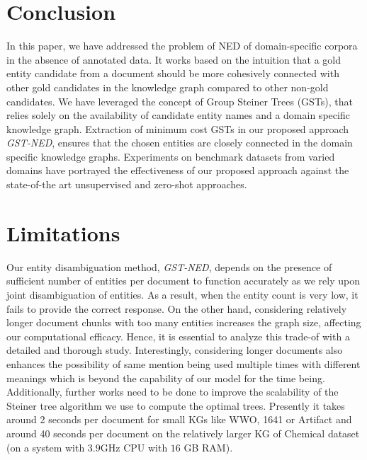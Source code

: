 \documentclass[11pt]{article}
\newcommand{\ts}[1]{\textcolor{blue}{[{DD: #1}]}}
\begin{document}


\section{Conclusion}
In this paper, we have addressed the problem of NED of domain-specific corpora in the absence of annotated data. It works based on the intuition that a gold
entity candidate from a document should be more cohesively connected with other gold candidates in the
knowledge graph compared to other non-gold candidates. We have leveraged the concept of Group Steiner Trees (GSTs), that relies solely on the availability of candidate entity names and a domain specific knowledge graph. Extraction of minimum cost GSTs in our proposed approach \emph{GST-NED}, ensures that the chosen entities are closely connected in the domain specific knowledge graphs.
Experiments on benchmark datasets from varied domains have portrayed the effectiveness of our proposed approach against the state-of-the art unsupervised and zero-shot approaches.

\section*{Limitations}
Our entity disambiguation method, \emph{GST-NED}, depends on the presence of sufficient number of entities per document to function accurately as we rely upon joint disambiguation of entities. As a result, when the entity count is very low, it fails to provide the correct response.
On the other hand, considering relatively longer document chunks with too many entities increases the graph size, affecting our computational efficacy. Hence, it is essential to analyze this trade-of with a detailed and thorough study. Interestingly, considering longer documents also enhances the possibility of same mention being used multiple times with different meanings which is beyond the capability of our model for the time being. 
Additionally, further works need to be done to improve the scalability of the Steiner tree algorithm we use to compute the optimal trees. Presently it takes around 2 seconds per document for small KGs like WWO, 1641 or Artifact and around 40 seconds per document on the relatively larger KG of Chemical dataset (on a system with $3.9$GHz CPU with $16$ GB RAM).
\end{document}
